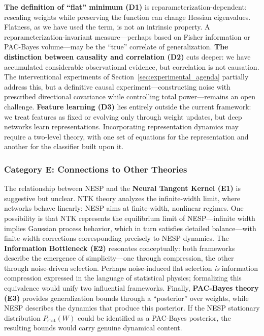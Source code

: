 \documentclass[
  journal=largetwo,
  simfonts=false,
  year=2025,
  volume=37,
]{cup-journal}
\begin{document}
\textbf{The definition of ``flat'' minimum (D1)} is reparameterization-dependent: rescaling weights while preserving the function can change Hessian eigenvalues. Flatness, as we have used the term, is not an intrinsic property. A reparameterization-invariant measure---perhaps based on Fisher information or PAC-Bayes volume---may be the ``true'' correlate of generalization. \textbf{The distinction between causality and correlation (D2)} cuts deeper: we have accumulated considerable observational evidence, but correlation is not causation. The interventional experiments of Section~\ref{sec:experimental_agenda} partially address this, but a definitive causal experiment---constructing noise with prescribed directional covariance while controlling total power---remains an open challenge. \textbf{Feature learning (D3)} lies entirely outside the current framework: we treat features as fixed or evolving only through weight updates, but deep networks learn representations. Incorporating representation dynamics may require a two-level theory, with one set of equations for the representation and another for the classifier built upon it.

\subsubsection{Category E: Connections to Other Theories}

The relationship between NESP and the \textbf{Neural Tangent Kernel (E1)} is suggestive but unclear. NTK theory analyzes the infinite-width limit, where networks behave linearly; NESP aims at finite-width, nonlinear regimes. One possibility is that NTK represents the equilibrium limit of NESP---infinite width implies Gaussian process behavior, which in turn satisfies detailed balance---with finite-width corrections corresponding precisely to NESP dynamics. The \textbf{Information Bottleneck (E2)} resonates conceptually: both frameworks describe the emergence of simplicity---one through compression, the other through noise-driven selection. Perhaps noise-induced flat selection \emph{is} information compression expressed in the language of statistical physics; formalizing this equivalence would unify two influential frameworks. Finally, \textbf{PAC-Bayes theory (E3)} provides generalization bounds through a ``posterior'' over weights, while NESP describes the dynamics that produce this posterior. If the NESP stationary distribution $P_{\mathrm{stat}}(W)$ could be identified as a PAC-Bayes posterior, the resulting bounds would carry genuine dynamical content.
\end{document}
